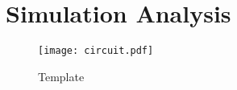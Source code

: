 \newpage

\section{Simulation Analysis}
\label{sec:simulation}

\begin{figure}[H]
        \centering
        \texttt{[image: circuit.pdf]}
        \caption{Template}
        \label{basic}
\end{figure}
